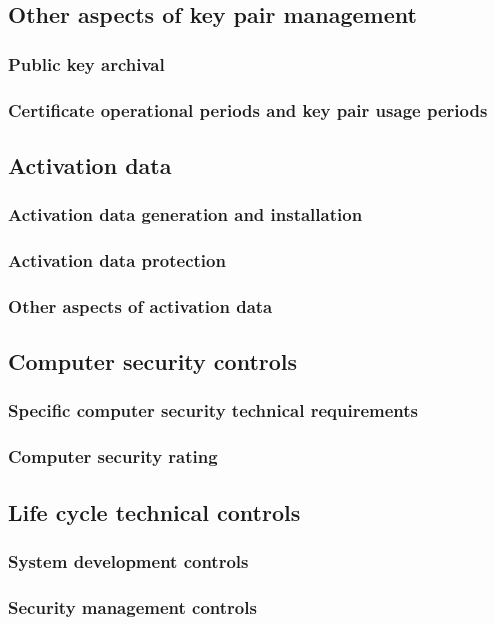 \documentclass[10pt]{article}
\begin{document}
\subsection{Other aspects of key pair management}
\subsubsection{Public key archival}
\subsubsection{Certificate operational periods and key pair usage periods}
\subsection{Activation data}
\subsubsection{Activation data generation and installation}
\subsubsection{Activation data protection}
\subsubsection{Other aspects of activation data}
\subsection{Computer security controls}
\subsubsection{Specific computer security technical requirements}
\subsubsection{Computer security rating}
\subsection{Life cycle technical controls}
\subsubsection{System development controls}
\subsubsection{Security management controls}
\end{document}
